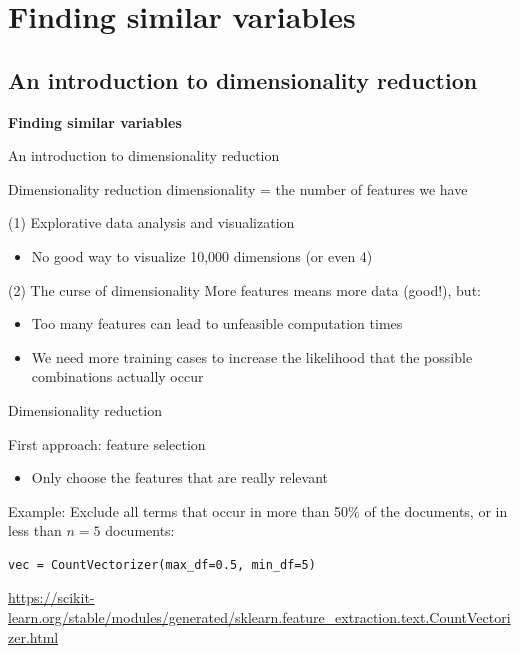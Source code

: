 \documentclass{beamer}
\begin{document}
\section{Finding similar variables}

\subsection{An introduction to dimensionality reduction}

\begin{frame}[plain]
\textbf{Finding similar variables}

An introduction to dimensionality reduction
\end{frame}


\begin{frame}{Dimensionality reduction}
dimensionality = the number of features we have



\begin{block}{(1) Explorative data analysis and visualization}
	\begin{itemize}
		\item No good way to visualize 10,000 dimensions (or even 4)
	\end{itemize}
\end{block}

\pause


\begin{block}{(2) The curse of dimensionality}
More features means more data (good!), but:
\begin{itemize}
	\item Too many features can lead to unfeasible computation times
	\item We need more training cases to increase the likelihood that the possible combinations actually occur
\end{itemize}
\end{block}
\end{frame}



\begin{frame}[fragile]{Dimensionality reduction}

\begin{block}{First approach: feature selection}
	\begin{itemize}
		\item Only choose the features that are really relevant
	\end{itemize}
\end{block}


Example: Exclude all terms that occur in more than 50\% of the documents, or in less than $n=5$ documents:

\begin{lstlisting}
vec = CountVectorizer(max_df=0.5, min_df=5)
\end{lstlisting}

\tiny{\url{https://scikit-learn.org/stable/modules/generated/sklearn.feature\_extraction.text.CountVectorizer.html}}

\end{frame}
\end{document}
